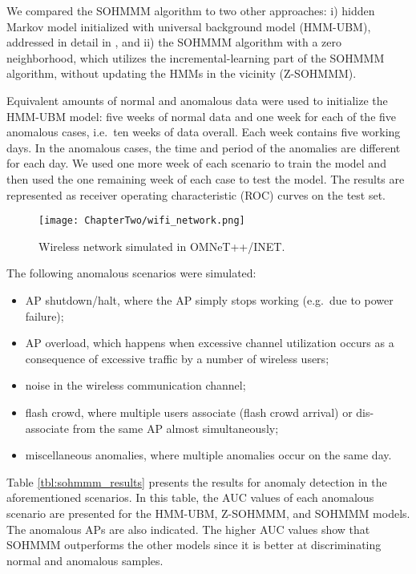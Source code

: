 We compared the SOHMMM algorithm to two other approaches: i) hidden Markov model initialized with universal background model (HMM-UBM), addressed in detail in \cite{Anisa2017}, and ii) the SOHMMM algorithm with a zero neighborhood, which utilizes the incremental-learning part of the SOHMMM algorithm, without updating the HMMs in the vicinity (Z-SOHMMM).

Equivalent amounts of normal and anomalous data were used to initialize the HMM-UBM model: five weeks of normal data and one week for each of the five anomalous cases, i.e.\ ten weeks of data overall. Each week contains five working days. In the anomalous cases, the time and period of the anomalies are different for each day. We used one more week of each scenario to train the model and then used the one remaining week of each case to test the model. The results are represented as receiver operating characteristic (ROC) curves on the test set.

\begin{figure}[h]
    \centering
    \texttt{[image: ChapterTwo/wifi\_network.png]}
    \caption{Wireless network simulated in OMNeT++/INET.}
    \label{fig:sohmmm_wifi_network}
\end{figure}

The following anomalous scenarios were simulated:
\begin{itemize}
    \item AP shutdown/halt, where the AP simply stops working (e.g.\ due to power failure);
    \item AP overload, which happens when excessive channel utilization occurs as a consequence of excessive traffic by a number of wireless users;
    \item noise in the wireless communication channel;
    \item flash crowd, where multiple users associate (flash crowd arrival) or dis-associate from the same AP almost simultaneously;
    \item miscellaneous anomalies, where multiple anomalies occur on the same day.
\end{itemize}

Table \ref{tbl:sohmmm_results} presents the results for anomaly detection in the aforementioned scenarios. In this table, the AUC values of each anomalous scenario are presented for the HMM-UBM, Z-SOHMMM, and SOHMMM models. The anomalous APs are also indicated. The higher AUC values show that SOHMMM outperforms the other models since it is better at discriminating normal and anomalous samples.

